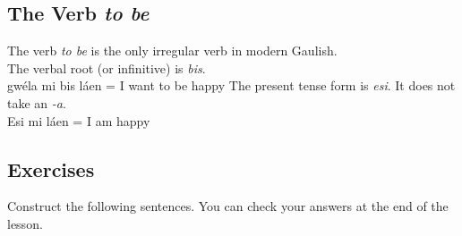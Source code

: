 \subsection{The Verb \textit{to be}}
The verb \textit{to be} is the only irregular verb in modern Gaulish.\\
The verbal root (or infinitive) is \textit{bis}.\\
gw\'{e}la mi bis l\'{a}en = I want to be happy
The present tense form is \textit{esi}. It does not take an \textit{-a}.\\
Esi mi l\'{a}en = I am happy

\newpage
\subsection{Exercises}

Construct the following sentences. You can check your answers at the end of the lesson.
